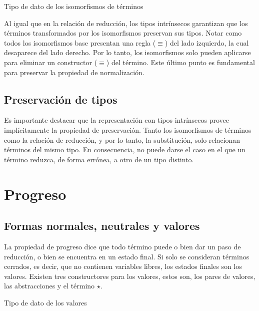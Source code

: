 \documentclass[]{report}
\begin{document}
	
	\begin{codigo}
		Tipo de dato de los isomorfismos de términos
		
	\end{codigo}
	
	Al igual que en la relación de reducción, los tipos intrínsecos garantizan que los términos transformados por los isomorfismos preservan sus tipos.
	Notar como todos los isomorfismos base presentan una regla ($\equiv$) del lado izquierdo, la cual desaparece del lado derecho.
	Por lo tanto, los isomorfismos solo pueden aplicarse para eliminar un constructor ($\equiv$) del término.
	Este último punto es fundamental para preservar la propiedad de normalización.
	
	
	\subsection{Preservación de tipos}
	
	Es importante destacar que la representación con tipos intrínsecos provee implícitamente la propiedad de preservación.
	Tanto los isomorfismos de términos como la relación de reducción, y por lo tanto, la substitución, solo relacionan términos del mismo tipo.
	En consecuencia, no puede darse el caso en el que un término reduzca, de forma errónea, a otro de un tipo distinto.
	

	\section{Progreso}
	
	\subsection{Formas normales, neutrales y valores}
	
	La propiedad de progreso dice que todo término puede o bien dar un paso de reducción, o bien se encuentra en un estado final.
	Si solo se consideran términos cerrados, es decir, que no contienen variables libres, los estados finales son los valores.
	Existen tres constructores para los valores, estos son, los pares de valores, las abstracciones y el término $\star$.
	
	\begin{codigo}
		Tipo de dato de los valores
	\end{codigo}
	
\end{document}
